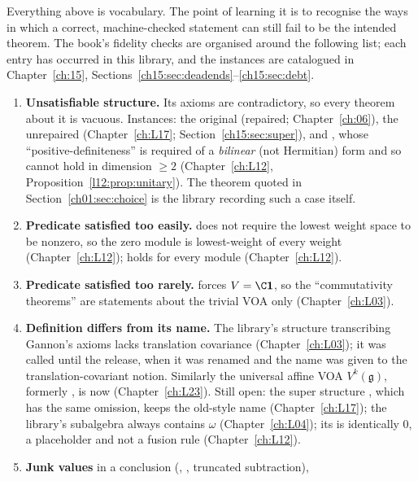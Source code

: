 Everything above is vocabulary. The point of learning it is to recognise the ways in which a
correct, machine-checked statement can still fail to be the intended theorem. The book's fidelity
checks are organised around the following list; each entry has occurred in this library, and the
instances are catalogued in Chapter~\ref{ch:15}, Sections~\ref{ch15:sec:deadends}--\ref{ch15:sec:debt}.
\begin{enumerate}[label=(F\arabic*)]
\item \textbf{Unsatisfiable structure.} Its axioms are contradictory, so every theorem about it is
  vacuous. Instances: the original  (repaired; Chapter~\ref{ch:06}), the
  unrepaired  (Chapter~\ref{ch:L17}; Section~\ref{ch15:sec:super}), and
  , whose ``positive-definiteness'' is required of a \emph{bilinear} (not
  Hermitian) form and so cannot hold in dimension $\ge2$ (Chapter~\ref{ch:L12},
  Proposition~\ref{l12:prop:unitary}). The  theorem quoted in
  Section~\ref{ch01:sec:choice} is the library recording such a case itself.
\item \textbf{Predicate satisfied too easily.}  does not require the
  lowest weight space to be nonzero, so the zero module is lowest-weight of every weight
  (Chapter~\ref{ch:L12});  holds for every module (Chapter~\ref{ch:L12}).
\item \textbf{Predicate satisfied too rarely.}  forces $V = \C\chonevac$, so the
  ``commutativity theorems'' are statements about the trivial VOA only (Chapter~\ref{ch:L03}).
\item \textbf{Definition differs from its name.} The library's structure transcribing Gannon's axioms lacks
  translation covariance (Chapter~\ref{ch:L03}); it was called  until the release, when it was renamed
   and the name  was given to the translation-covariant notion. Similarly the
  universal affine VOA $V^k(\mathfrak g)$, formerly , is now 
  (Chapter~\ref{ch:L23}). Still open: the super structure , which has the same omission, keeps the old-style
  name (Chapter~\ref{ch:L17}); the library's  subalgebra always contains $\omega$
  (Chapter~\ref{ch:L04}); its  is identically $0$, a placeholder and not a fusion rule (Chapter~\ref{ch:L12}).
\item \textbf{Junk values} in a conclusion (, , truncated subtraction),

\end{enumerate}
